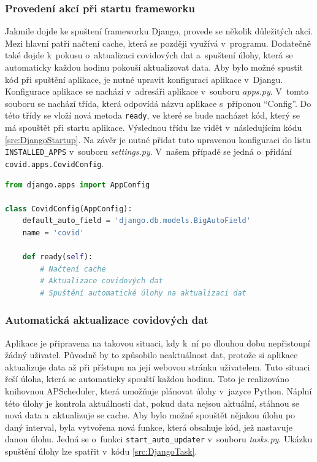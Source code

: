 \subsubsection*{Provedení akcí při startu frameworku}

Jakmile dojde ke spuštení frameworku Django, provede se několik důležitých akcí. Mezi hlavní patří načtení cache, která se později využívá v~programu. Dodatečně také dojde k~pokusu o~aktualizaci covidových dat a~spuštení úlohy, která se automaticky každou hodinu pokouší aktualizovat data. Aby bylo možné spustit kód při spuštění aplikace, je nutné upravit konfiguraci aplikace v~Djangu. Konfigurace aplikace se nachází v~adresáři aplikace v~souboru \emph{apps.py}. V~tomto souboru se nachází třída, která odpovídá názvu aplikace s~příponou \enquote{Config}. Do této třídy se vloží nová metoda \lstinline{ready}, ve které se bude nacházet kód, který se má spouštět při startu aplikace. Výslednou třídu lze vidět v~následujícím kódu \ref{src:DjangoStartup}. Na závěr je nutné přidat tuto upravenou konfiguraci do listu \texttt{INSTALLED\_APPS} v~souboru \emph{settings.py}. V~našem případě se jedná o~přidání \lstinline{covid.apps.CovidConfig}.

\begin{lstlisting}[language=Python,label=src:DjangoStartup,caption={Změna konfigurace aplikace v Djangu}]
from django.apps import AppConfig

class CovidConfig(AppConfig):
    default_auto_field = 'django.db.models.BigAutoField'
    name = 'covid'

    def ready(self):
        # Načtení cache
        # Aktualizace covidových dat
        # Spuštění automatické úlohy na aktualizaci dat
\end{lstlisting}

\subsubsection*{Automatická aktualizace covidových dat}

Aplikace je připravena na takovou situaci, kdy k~ní po dlouhou dobu nepřistoupí žádný uživatel. Původně by to způsobilo neaktuálnost dat, protože si aplikace aktualizuje data až při přístupu na její webovou stránku uživatelem. Tuto situaci řeší úloha, která se automaticky spouští každou hodinu. Toto je realizováno knihovnou APScheduler, která umožňuje plánovat úlohy v~jazyce Python. Náplní této úlohy je kontrola aktuálnosti dat, pokud data nejsou aktuální, stáhnou se nová data a~aktualizuje se cache. Aby bylo možné spouštět nějakou úlohu po daný interval, byla vytvořena nová funkce, která obsahuje kód, jež nastavuje danou úlohu. Jedná se o~funkci \lstinline{start_auto_updater} v~souboru \emph{tasks.py}. Ukázku spuštění úlohy lze spatřit v~kódu \ref{src:DjangoTask}.  

